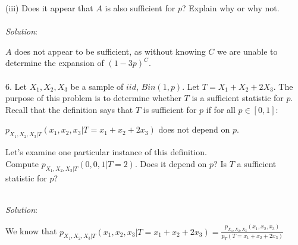 \documentclass[12pt]{article}
\newcommand{\XB}{\color{black}}
\newcommand{\XBB}{\color{blue}}
\newcommand{\XV}{\color{violet}}
\begin{document}

(iii) Does it appear that $ A $ is also sufficient for $ p $? Explain why or why not. \\
\vspace{2.5mm} \\
\textit{Solution}:
\vspace{2.5mm}

\noindent
$ A $ does not appear to be sufficient, as without knowing $ C $ we are unable to determine the expansion of $ (1 -3p)^{C} $. \\

\newpage
\XBB\hrulefill\XB \\

6. Let $ X_{1}, X_{2}, X_{3} $ be a sample of $ iid $, $ Bin(1,p) $. Let $ T = X_{1} + X_{2} + 2X_{3} $.
The purpose of this problem is to determine whether $ T $ is a sufficient statistic for $ p $.
Recall that the definition says that $ T $ is sufficient for $ p $ if for all $ p \in [0, 1] $: \\
\begin{center}
    $ p_{X_{1}, X_{2}, X_{3} | T}(x_{1}, x_{2}, x_{3} | T = x_{1} + x_{2} + 2x_{3}) $ does not depend on $ p $. \\
\end{center}
Let’s examine one particular instance of this definition. \\
\indent Compute $ p_{X_{1}, X_{2}, X_{3} | T}(0, 0, 1 | T = 2) $. Does it depend on $ p $? Is $ T $ a sufficient statistic for $ p $?

\XBB\hrulefill\XB
\vspace{5mm} \\


\textit{Solution}:
\vspace{2.5mm}

\noindent
We know that $ \displaystyle p_{X_{1}, X_{2}, X_{3} | T}(x_{1}, x_{2}, x_{3} | T = x_{1} + x_{2} + 2x_{3}) = \frac{p_{X_{1}, X_{2}, X_{3}}(x_{1}, x_{2}, x_{3})}{p_{T}(T = x_{1} + x_{2} + 2x_{3})} $
\end{document}
